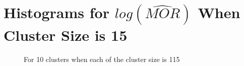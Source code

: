 \documentclass[
  letterpaper,
  DIV=11,
  numbers=noendperiod]{scrartcl}
\begin{document}
\newpage

\hypertarget{histograms-for-logwidehatmor-when-cluster-size-is-15}{%
\section{\texorpdfstring{Histograms for \(log(\widehat{MOR})\) When
Cluster Size is
15}{Histograms for log(\textbackslash widehat\{MOR\}) When Cluster Size is 15}}\label{histograms-for-logwidehatmor-when-cluster-size-is-15}}

\vspace{5mm}

\begin{figure}

\begin{minipage}[t]{0.44\linewidth}

{\centering 


\caption{For 10 clusters when each of the cluster size is 115}

}

\end{minipage}%
%
\begin{minipage}[t]{0.11\linewidth}


\end{minipage}
\end{figure}
\end{document}
